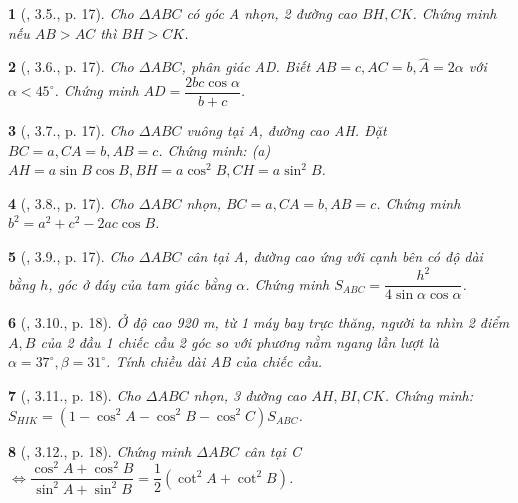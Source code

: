 \documentclass{article}
\newtheorem{baitoan}{}
\begin{document}
\begin{baitoan}[\cite{TLCT_THCS_Toan_9_hinh_hoc}, 3.5., p. 17]
	Cho $\Delta ABC$ có góc A nhọn, 2 đường cao $BH,CK$. Chứng minh nếu $AB > AC$ thì $BH > CK$.
\end{baitoan}

\begin{baitoan}[\cite{TLCT_THCS_Toan_9_hinh_hoc}, 3.6., p. 17]
	Cho $\Delta ABC$, phân giác AD. Biết $AB = c,AC = b,\widehat{A} = 2\alpha$ với $\alpha < 45^\circ$. Chứng minh $AD = \dfrac{2bc\cos\alpha}{b + c}$.
\end{baitoan}

\begin{baitoan}[\cite{TLCT_THCS_Toan_9_hinh_hoc}, 3.7., p. 17]
	Cho $\Delta ABC$ vuông tại A, đường cao AH. Đặt $BC = a,CA = b,AB = c$. Chứng minh: (a) $AH = a\sin B\cos B,BH = a\cos^2B,CH = a\sin^2B$.
\end{baitoan}

\begin{baitoan}[\cite{TLCT_THCS_Toan_9_hinh_hoc}, 3.8., p. 17]
	Cho $\Delta ABC$ nhọn, $BC = a,CA = b,AB = c$. Chứng minh $b^2 = a^2 + c^2 - 2ac\cos B$.
\end{baitoan}

\begin{baitoan}[\cite{TLCT_THCS_Toan_9_hinh_hoc}, 3.9., p. 17]
	Cho $\Delta ABC$ cân tại A, đường cao ứng với cạnh bên có độ dài bằng $h$, góc ở đáy của tam giác bằng $\alpha$. Chứng minh $S_{ABC} = \dfrac{h^2}{4\sin\alpha\cos\alpha}$.
\end{baitoan}

\begin{baitoan}[\cite{TLCT_THCS_Toan_9_hinh_hoc}, 3.10., p. 18]
	Ở độ cao {\rm920 m}, từ 1 máy bay trực thăng, người ta nhìn 2 điểm $A,B$ của 2 đầu 1 chiếc cầu 2 góc so với phương nằm ngang lần lượt là $\alpha = 37^\circ,\beta = 31^\circ$. Tính chiều dài AB của chiếc cầu.
\end{baitoan}

\begin{baitoan}[\cite{TLCT_THCS_Toan_9_hinh_hoc}, 3.11., p. 18]
	Cho $\Delta ABC$ nhọn, 3 đường cao $AH,BI,CK$. Chứng minh: $S_{HIK} = (1 - \cos^2A - \cos^2B - \cos^2C)S_{ABC}$.
\end{baitoan}

\begin{baitoan}[\cite{TLCT_THCS_Toan_9_hinh_hoc}, 3.12., p. 18]
	Chứng minh $\Delta ABC$ cân tại C $\Leftrightarrow\dfrac{\cos^2A + \cos^2B}{\sin^2A + \sin^2B} = \dfrac{1}{2}(\cot^2A + \cot^2B)$.
\end{baitoan}
\end{document}
